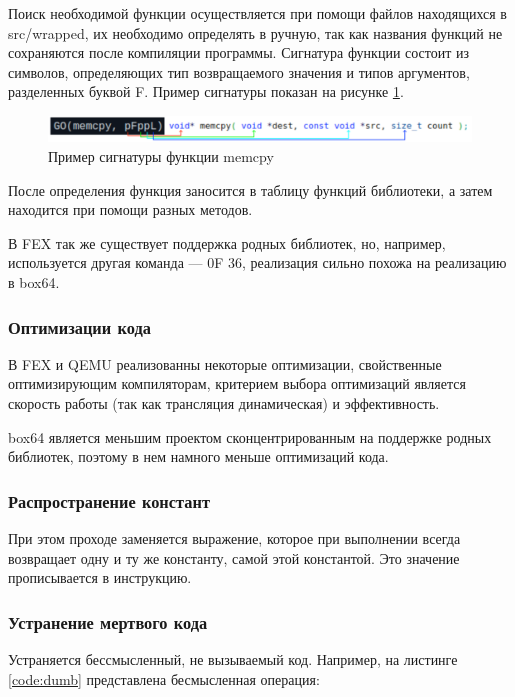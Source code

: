 Поиск необходимой функции осуществляется при помощи файлов находящихся в src/wrapped, их необходимо определять в ручную, так как названия функций не сохраняются после компиляции программы. Сигнатура функции состоит из символов, определяющих тип возвращаемого значения и типов аргументов, разделенных буквой F. Пример сигнатуры показан на рисунке \ref{fig:box64sig}.

\begin{figure}[hbtp]
	\centering
	\includegraphics[width=\textwidth]{img/box64_sig.png}
	\caption{Пример сигнатуры функции memcpy}
	\label{fig:box64sig}
\end{figure}

После определения функция заносится в таблицу функций библиотеки, а затем находится при помощи разных методов. \cite{box64_deep}

В FEX так же существует поддержка родных библиотек, но, например, используется другая команда --- 0F 36, реализация сильно похожа на реализацию в box64.

\subsubsection{Оптимизации кода}

В FEX и QEMU реализованны некоторые оптимизации, свойственные оптимизирующим компиляторам, критерием выбора оптимизаций является скорость работы (так как трансляция динамическая) и эффективность.

box64 является меньшим проектом сконцентрированным на поддержке родных библиотек, поэтому в нем намного меньше оптимизаций кода.

\subsubsection{Распространение констант}

При этом проходе заменяется выражение, которое при выполнении всегда возвращает одну и ту же константу, самой этой константой. Это значение прописывается в инструкцию.

\subsubsection{Устранение мертвого кода}

Устраняется бессмысленный, не вызываемый код.
Например, на листинге \ref{code:dumb} представлена бесмысленная операция:

